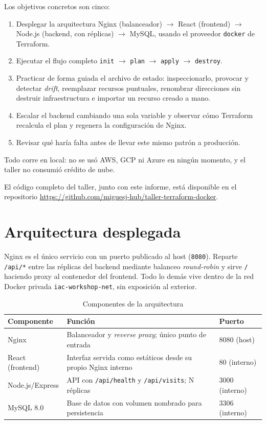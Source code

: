\documentclass[11pt,a4paper]{article}
\begin{document}
Los objetivos concretos son cinco:

\begin{enumerate}
  \item Desplegar la arquitectura Nginx (balanceador) $\rightarrow$ React
        (frontend) $\rightarrow$ Node.js (backend, con réplicas)
        $\rightarrow$ MySQL, usando el proveedor \texttt{docker} de
        Terraform.
  \item Ejecutar el flujo completo \texttt{init} $\rightarrow$
        \texttt{plan} $\rightarrow$ \texttt{apply} $\rightarrow$
        \texttt{destroy}.
  \item Practicar de forma guiada el archivo de estado: inspeccionarlo,
        provocar y detectar \emph{drift}, reemplazar recursos puntuales,
        renombrar direcciones sin destruir infraestructura e importar un
        recurso creado a mano.
  \item Escalar el backend cambiando una sola variable y observar cómo
        Terraform recalcula el plan y regenera la configuración de Nginx.
  \item Revisar qué haría falta antes de llevar este mismo patrón a
        producción.
\end{enumerate}

Todo corre en local: no se usó AWS, GCP ni Azure en ningún momento, y el
taller no consumió crédito de nube.

El código completo del taller, junto con este informe, está disponible en
el repositorio
\url{https://github.com/miguesj-hub/taller-terraform-docker}.

\section{Arquitectura desplegada}

Nginx es el único servicio con un puerto publicado al host
(\texttt{8080}). Reparte \texttt{/api/*} entre las réplicas del backend
mediante balanceo \emph{round-robin} y sirve \texttt{/} haciendo proxy al
contenedor del frontend. Todo lo demás vive dentro de la red Docker
privada \texttt{iac-workshop-net}, sin exposición al exterior.

\begin{table}[H]
\centering
\caption{Componentes de la arquitectura}
\begin{tabularx}{\linewidth}{@{}lYl@{}}
\toprule
\textbf{Componente} & \textbf{Función} & \textbf{Puerto} \\
\midrule
Nginx           & Balanceador y \emph{reverse proxy}; único punto de entrada & 8080 (host) \\
React (frontend)& Interfaz servida como estáticos desde su propio Nginx interno & 80 (interno) \\
Node.js/Express & API con \texttt{/api/health} y \texttt{/api/visits}; N réplicas & 3000 (interno) \\
MySQL 8.0       & Base de datos con volumen nombrado para persistencia & 3306 (interno) \\
\bottomrule
\end{tabularx}
\end{table}
\end{document}
